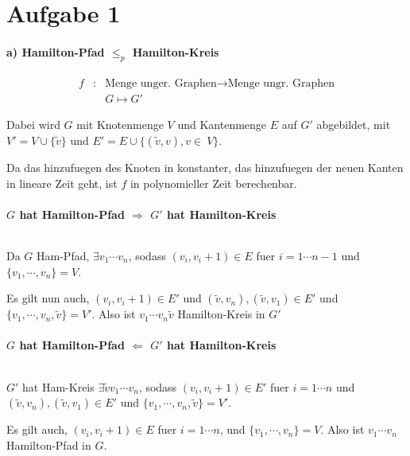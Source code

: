 




\newcommand{\nr}{12}


\section*{Aufgabe 1}
\paragraph{a) Hamilton-Pfad $\leq_p$ Hamilton-Kreis}

\begin{eqnarray}
f &:& \text{Menge unger. Graphen} \to \text{Menge ungr. Graphen}\\
  & & G \mapsto G'
\end{eqnarray}

Dabei wird $G$ mit Knotenmenge $V$ und Kantenmenge $E$ auf $G'$ abgebildet, mit 
$V' = V \cup \{\tilde{v}\}$ und $E' = E \cup \{ (\tilde{v}, v), v\in~V\}$.

Da das hinzufuegen des Knoten in konstanter, das hinzufuegen der neuen Kanten in lineare Zeit
geht, ist $f$ in polynomieller Zeit berechenbar.

\paragraph{$G$ hat Hamilton-Pfad $\Rightarrow$ $G'$ hat Hamilton-Kreis} $ $ 

Da $G$ Ham-Pfad, $\exists v_1 \cdots v_n$, sodass $(v_i, v_i+1) \in E$ fuer $i=1\cdots n-1$
und $\{v_1, \cdots, v_n\} = V$. 

Es gilt nun auch, $(v_i, v_i+1) \in E'$ und $(\tilde{v}, v_n), (\tilde{v}, v_1) \in E'$
und $\{v_1, \cdots, v_n, \tilde{v}\} = V'$. Also ist $v_1 \cdots v_n \tilde{v}$ Hamilton-Kreis in $G'$

\paragraph{$G$ hat Hamilton-Pfad $\Leftarrow$ $G'$ hat Hamilton-Kreis} $ $ 

$G'$ hat Ham-Kreis \tf $\exists \tilde{v} v_1 \cdots v_n$, 
    sodass $(v_i, v_i+1) \in E'$ fuer $i=1\cdots n$ und $(\tilde{v}, v_n), (\tilde{v}, v_1) \in E'$ und $\{v_1, \cdots, v_n, \tilde{v}\} = V'$.

Es gilt auch, $(v_i, v_i+1) \in E$ fuer $i=1\cdots n$, und $\{v_1, \cdots, v_n\} = V$. Also
ist $v_1 \cdots v_n$ Hamilton-Pfad in $G$.



